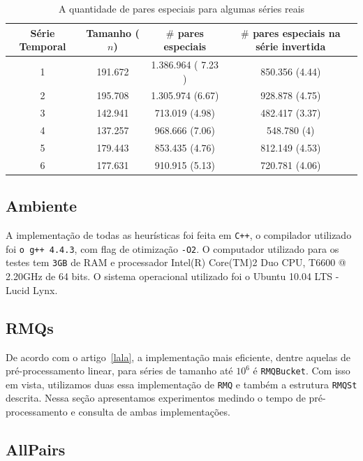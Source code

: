 \documentclass[12pt]{article}
\begin{document}
\begin{table}
\small
\begin{center}
\begin{tabular}{|c|c|c|c|}
\hline
 {\bf Série Temporal}  & {\bf Tamanho} ($n$) & {\bf $\#$ pares especiais} & {\bf $\# $ pares especiais na série invertida} \\ 
\hline
 1 & 191.672   & 1.386.964 ( 7.23 ) &  850.356 (4.44) \\
\hline
 2 & 195.708 & 1.305.974  (6.67) & 928.878 (4.75)\\
\hline
 3 & 142.941 &   713.019 (4.98) & 482.417  (3.37) \\
\hline
 4 & 137.257 &  968.666  (7.06) &  548.780 (4)\\
\hline
 5 & 179.443 & 853.435 (4.76) &  812.149 (4.53) \\
\hline
6  &  177.631 &  910.915 (5.13) &  720.781  (4.06) \\ \hline
\end{tabular}
\end{center}
\label{tab:Special-pairs}
\caption{A quantidade de pares especiais para algumas séries reais}
\normalsize
\end{table}


\subsection{Ambiente}

A implementação de todas as heurísticas foi feita em \verb|C++|, o compilador
utilizado foi \verb|o g++ 4.4.3|, com flag de otimização \verb|-O2|. O computador
utilizado para os testes tem \verb|3GB| de RAM e processador Intel(R) Core(TM)2 Duo CPU, T6600  @ 2.20GHz
de 64 bits. O sistema operacional utilizado foi o Ubuntu 10.04 LTS - Lucid Lynx.


\subsection{RMQs}

De acordo com o artigo~\ref{lala}, a implementação mais eficiente, dentre aquelas
de pré-processamento linear,  para séries de tamanho até $10^6$ é {\tt RMQBucket}.
Com isso em vista, utilizamos duas essa implementação de {\tt RMQ} e também a estrutura
{\tt RMQSt} descrita. Nessa seção apresentamos experimentos medindo o tempo de pré-processamento
e consulta de ambas implementações.


\subsection{AllPairs}
\end{document}
